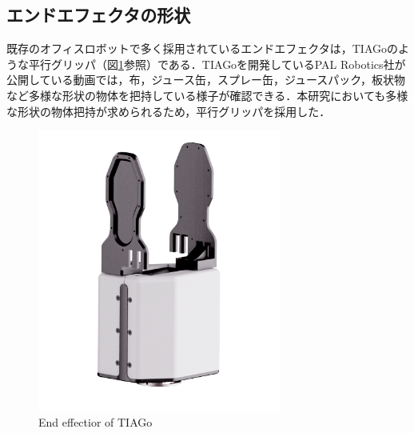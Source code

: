 \subsection{エンドエフェクタの形状}
既存のオフィスロボットで多く採用されているエンドエフェクタは，TIAGoのような平行グリッパ（図\ref{fig:tiago_hand}参照）である．TIAGoを開発しているPAL Robotics社が公開している動画\cite{TIAGo-movie:online}では，布，ジュース缶，スプレー缶，ジュースパック，板状物など多様な形状の物体を把持している様子が確認できる．本研究においても多様な形状の物体把持が求められるため，平行グリッパを採用した．
\begin{figure}[h]
  \centering
  \includegraphics[width=8cm]{images/2syou/tiago_hand.png}
  \caption{End effectior of TIAGo}
  \label{fig:tiago_hand}
\end{figure}
\clearpage
\newpage